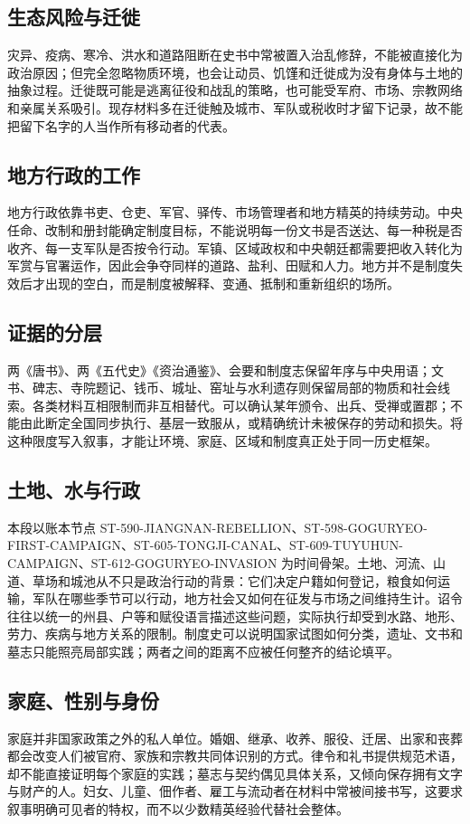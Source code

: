 \subsection{生态风险与迁徙}
灾异、疫病、寒冷、洪水和道路阻断在史书中常被置入治乱修辞，不能被直接化为政治原因；但完全忽略物质环境，也会让动员、饥馑和迁徙成为没有身体与土地的抽象过程。迁徙既可能是逃离征役和战乱的策略，也可能受军府、市场、宗教网络和亲属关系吸引。现存材料多在迁徙触及城市、军队或税收时才留下记录，故不能把留下名字的人当作所有移动者的代表。

\subsection{地方行政的工作}
地方行政依靠书吏、仓吏、军官、驿传、市场管理者和地方精英的持续劳动。中央任命、改制和册封能确定制度目标，不能说明每一份文书是否送达、每一种税是否收齐、每一支军队是否按令行动。军镇、区域政权和中央朝廷都需要把收入转化为军赏与官署运作，因此会争夺同样的道路、盐利、田赋和人力。地方并不是制度失效后才出现的空白，而是制度被解释、变通、抵制和重新组织的场所。

\subsection{证据的分层}
两《唐书》、两《五代史》《资治通鉴》、会要和制度志保留年序与中央用语；文书、碑志、寺院题记、钱币、城址、窑址与水利遗存则保留局部的物质和社会线索。各类材料互相限制而非互相替代。可以确认某年颁令、出兵、受禅或置郡；不能由此断定全国同步执行、基层一致服从，或精确统计未被保存的劳动和损失。将这种限度写入叙事，才能让环境、家庭、区域和制度真正处于同一历史框架。
\subsection{土地、水与行政}
本段以账本节点 ST-590-JIANGNAN-REBELLION、ST-598-GOGURYEO-FIRST-CAMPAIGN、ST-605-TONGJI-CANAL、ST-609-TUYUHUN-CAMPAIGN、ST-612-GOGURYEO-INVASION 为时间骨架。土地、河流、山道、草场和城池从不只是政治行动的背景：它们决定户籍如何登记，粮食如何运输，军队在哪些季节可以行动，地方社会又如何在征发与市场之间维持生计。诏令往往以统一的州县、户等和赋役语言描述这些问题，实际执行却受到水路、地形、劳力、疾病与地方关系的限制。制度史可以说明国家试图如何分类，遗址、文书和墓志只能照亮局部实践；两者之间的距离不应被任何整齐的结论填平。

\subsection{家庭、性别与身份}
家庭并非国家政策之外的私人单位。婚姻、继承、收养、服役、迁居、出家和丧葬都会改变人们被官府、家族和宗教共同体识别的方式。律令和礼书提供规范术语，却不能直接证明每个家庭的实践；墓志与契约偶见具体关系，又倾向保存拥有文字与财产的人。妇女、儿童、佃作者、雇工与流动者在材料中常被间接书写，这要求叙事明确可见者的特权，而不以少数精英经验代替社会整体。

